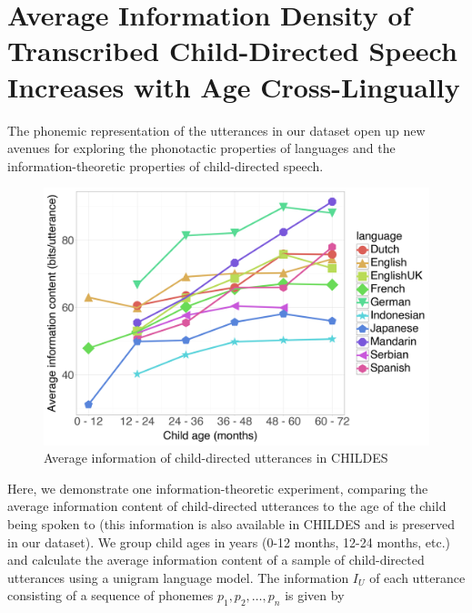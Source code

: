 \section{Average Information Density of Transcribed Child-Directed Speech Increases with Age Cross-Lingually}\label{app:13-parentese}

The phonemic representation of the utterances in our dataset open up new avenues for exploring the phonotactic properties of languages and the information-theoretic properties of child-directed speech. %


\begin{figure}
    \centering
    \includegraphics[width=0.99\linewidth]{Figures/13Dataset/information-trends.png}
    \caption{Average information of child-directed utterances in CHILDES}
    \label{fig:13-information-trends}
\end{figure}

Here, we demonstrate one information-theoretic experiment, comparing the average information content of child-directed utterances to the age of the child being spoken to (this information is also available in CHILDES and is preserved in our dataset). We group child ages in years (0-12 months, 12-24 months, etc.) and calculate the average information content of a sample of child-directed utterances using a unigram language model. The information $I_U$ of each utterance consisting of a sequence of phonemes $p_1,p_2,\ldots,p_n$ is given by

